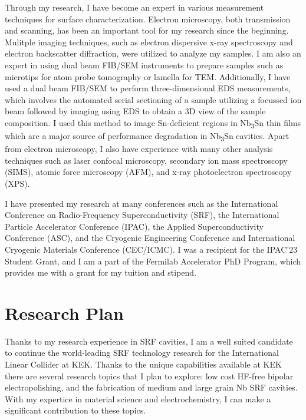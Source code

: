 \documentclass[]{revtex4-2}
\begin{document}
    Through my research, I have become an expert in various measurement techniques for surface characterization. Electron microscopy, both transmission and scanning, has been an important tool for my research since the beginning. Mulitple imaging techniques, such as electron dispersive x-ray spectroscopy and electron backscatter diffraction, were utilized to analyze my samples. I am also an expert in using dual beam FIB/SEM instruments to prepare samples such as microtips for atom probe tomography or lamella for TEM. Additionally, I have used a dual beam FIB/SEM to perform three-dimensional EDS measurements, which involves the automated serial sectioning of a sample utilizing a focussed ion beam followed by imaging using EDS to obtain a 3D view of the sample composition. I used this method to image Sn-deficient regions in Nb\textsubscript{3}Sn thin films which are a major source of performance degradation in Nb\textsubscript{3}Sn cavities. \cite{viklund2023three} Apart from electron microscopy, I also have experience with many other analysis techniques such as laser confocal microscopy, secondary ion mass spectroscopy (SIMS), atomic force microscopy (AFM), and x-ray photoelectron spectroscopy (XPS).

    I have presented my research at many conferences such as the International Conference on Radio-Frequency Superconductivity (SRF), the International Particle Accelerator Conference (IPAC), the Applied Superconductivity Conference (ASC), and the Cryogenic Engineering Conference and International Cryogenic Materials Conference (CEC/ICMC). I was a recipient for the IPAC'23 Student Grant, and I am a part of the Fermilab Accelerator PhD Program, which provides me with a grant for my tuition and stipend.





\section{Research Plan}


    Thanks to my research experience in SRF cavities, I am a well suited candidate to continue the world-leading SRF technology research for the International Linear Collider at KEK. Thanks to the unique capabilities available at KEK there are several research topics that I plan to explore: low cost HF-free bipolar electropolishing, and the fabrication of medium and large grain Nb SRF cavities. With my expertice in material science and electrochemistry, I can make a significant contribution to these topics.
    
\end{document}
